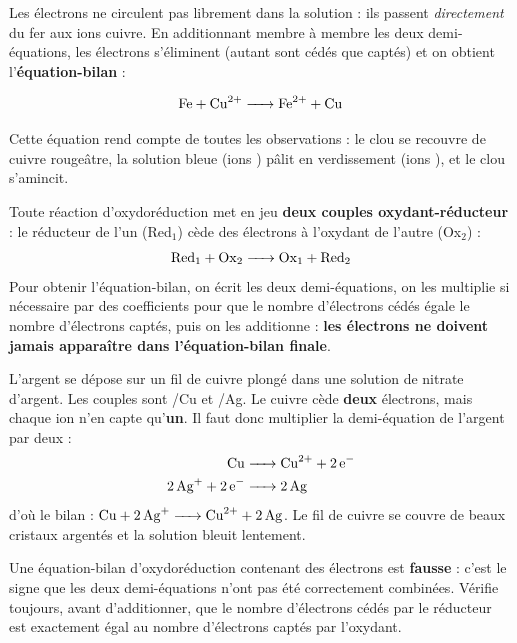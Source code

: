 \documentclass[11pt]{article}
\begin{document}
Les électrons ne circulent pas librement dans la solution : ils passent \emph{directement} du fer aux ions cuivre. En additionnant membre à membre les deux demi-équations, les électrons s'éliminent (autant sont cédés que captés) et on obtient l'\textbf{équation-bilan} :

\[ \ce{Fe + Cu^2+ -> Fe^2+ + Cu} \]

Cette équation rend compte de toutes les observations : le clou se recouvre de cuivre rougeâtre, la solution bleue (ions ) pâlit en verdissement (ions ), et le clou s'amincit.

\begin{aretenir}[Une réaction d'oxydoréduction = deux couples]
Toute réaction d'oxydoréduction met en jeu \textbf{deux couples oxydant-réducteur} : le réducteur de l'un (Red$_1$) cède des électrons à l'oxydant de l'autre (Ox$_2$) :
\[ \ce{Red1 + Ox2 -> Ox1 + Red2} \]
Pour obtenir l'équation-bilan, on écrit les deux demi-équations, on les multiplie si nécessaire par des coefficients pour que le nombre d'électrons cédés égale le nombre d'électrons captés, puis on les additionne : \textbf{les électrons ne doivent jamais apparaître dans l'équation-bilan finale}.
\end{aretenir}

\begin{exemplebox}
L'argent se dépose sur un fil de cuivre plongé dans une solution de nitrate d'argent. Les couples sont /Cu et /Ag. Le cuivre cède \textbf{deux} électrons, mais chaque ion  n'en capte qu'\textbf{un}. Il faut donc multiplier la demi-équation de l'argent par deux :
\begin{align*}
\ce{Cu &-> Cu^2+ + 2e-} \\
\ce{2Ag+ + 2e- &-> 2Ag}
\end{align*}
d'où le bilan : $\ce{Cu + 2Ag+ -> Cu^2+ + 2Ag}$. Le fil de cuivre se couvre de beaux cristaux argentés et la solution bleuit lentement.
\end{exemplebox}

\begin{attention}
Une équation-bilan d'oxydoréduction contenant des électrons est \textbf{fausse} : c'est le signe que les deux demi-équations n'ont pas été correctement combinées. Vérifie toujours, avant d'additionner, que le nombre d'électrons cédés par le réducteur est exactement égal au nombre d'électrons captés par l'oxydant.
\end{attention}
\end{document}
